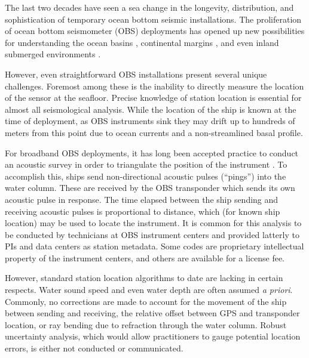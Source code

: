 The last two decades have seen a sea change in the longevity, distribution, and sophistication of temporary ocean bottom seismic installations. The proliferation of ocean bottom seismometer (OBS) deployments has opened up new possibilities for understanding the ocean basins \citep[e.g.][]{Lin2016,Takeo2016}, continental margins \citep[e.g.][]{Janiszewski2015,Hawley2016,Lynner2017,Eilon2017}, and even inland submerged environments \citep[e.g.][]{Accardo2017}. 

However, even straightforward OBS installations present several unique challenges. Foremost among these is the inability to directly measure the location of the sensor at the seafloor. Precise knowledge of station location is essential for almost all seismological analysis. While the location of the ship is known at the time of deployment, as OBS instruments sink they may drift up to hundreds of meters from this point due to ocean currents and a non-streamlined basal profile. 

For broadband OBS deployments, it has long been accepted practice to conduct an acoustic survey in order to triangulate the position of the instrument \citep[i.e.,][]{Creager1982}. To accomplish this, ships send non-directional acoustic pulses (``pings'') into the water column. These are received by the OBS transponder which sends its own acoustic pulse in response. The time elapsed between the ship sending and receiving acoustic pulses is proportional to distance, which (for known ship location) may be used to locate the instrument. It is common for this analysis to be conducted by technicians at OBS instrument centers and provided latterly to PIs and data centers as station metadata. Some codes are proprietary intellectual property of the instrument centers, and others are available for a license fee. 

However, standard station location algorithms to date are lacking in certain respects. Water sound speed and even water depth are often assumed \textit{a priori}. Commonly, no corrections are made to account for the movement of the ship between sending and receiving, the relative offset between GPS and transponder location, or ray bending due to refraction through the water column. Robust uncertainty analysis, which would allow practitioners to gauge potential location errors, is either not conducted or communicated.


